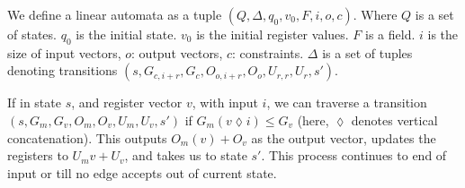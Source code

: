 We define a linear automata as 
a tuple $(Q, \Delta, q_0, v_0, F, i, o, c)$.
Where $Q$ is a set of states.
$q_0$ is the initial state.
$v_0$ is the initial register values.
$F$ is a field.
$i$ is the size of input vectors,
$o$: output vectors,
$c$: constraints.
$\Delta$ is a set of tuples denoting transitions $(s, G_{c, i+r}, G_c, O_{o, i+r}, O_o, U_{r, r}, U_r, s')$.

If in state $s$, 
and register vector $v$,
with input $i$,
we can traverse a transition $(s, G_m , G_v, O_m, O_v, U_m, U_v, s')$ if $G_m(v \lozenge i) \leq G_v$ (here, $\lozenge$ denotes vertical concatenation).
This outputs $O_m(v) + O_v$ as the output vector, updates the registers to $U_mv + U_v$, and takes us to state $s'$.
This process continues to end of input
or till no edge accepts out of current state.